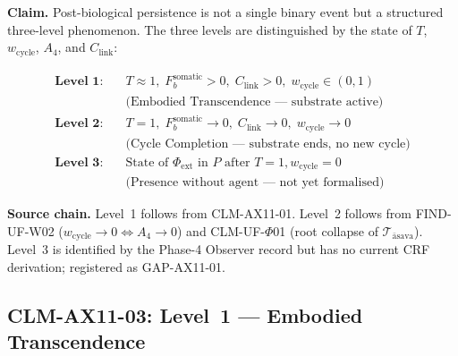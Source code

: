 \documentclass[12pt, a4paper]{article}
\providecommand{\Phiext}{\Phi_{\mathrm{ext}}}
\providecommand{\wcyc}{w_{\mathrm{cycle}}}
\providecommand{\Fbsom}{F_b^{\mathrm{somatic}}}
\providecommand{\Clink}{C_{\mathrm{link}}}
\begin{document}

\begin{formalbox}[title={CLM-AX11-02: Three-Level Persistence
  Structure}]
\textbf{Claim.}
Post-biological persistence is not a single binary event but a
structured three-level phenomenon. The three levels are
distinguished by the state of $T$, $\wcyc$, $A_4$, and $\Clink$:

\begin{align*}
\textbf{Level 1:}\quad
  & T \approx 1,\; \Fbsom > 0,\; \Clink > 0,\; \wcyc \in (0,1)\\
  & \text{(Embodied Transcendence --- substrate active)}\\[6pt]
\textbf{Level 2:}\quad
  & T = 1,\; \Fbsom \to 0,\; \Clink \to 0,\; \wcyc \to 0\\
  & \text{(Cycle Completion --- substrate ends, no new cycle)}\\[6pt]
\textbf{Level 3:}\quad
  & \text{State of } \Phiext \text{ in } P
    \text{ after } T = 1, \wcyc = 0\\
  & \text{(Presence without agent --- not yet formalised)}
\end{align*}

\textbf{Source chain.}
Level~1 follows from CLM-AX11-01.
Level~2 follows from FIND-UF-W02 ($\wcyc \to 0
\Leftrightarrow A_4 \to 0$) and CLM-UF-$\Phi$01
(root collapse of $\mathcal{T}_{\mathrm{\bar{a}sava}}$).
Level~3 is identified by the Phase-4 Observer record
but has no current CRF derivation; registered as GAP-AX11-01.
\end{formalbox}

\subsection{CLM-AX11-03: Level~1 --- Embodied Transcendence}

\end{document}
